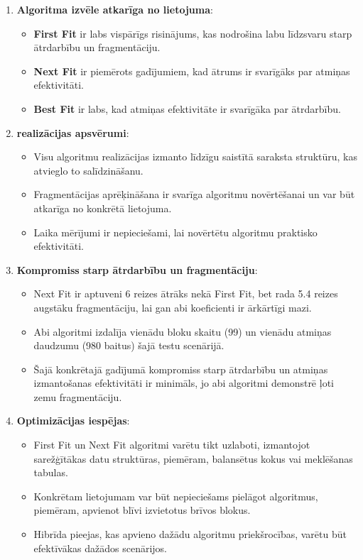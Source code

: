 \documentclass{report}
\begin{document}
	\begin{enumerate}
		\item \textbf{Algoritma izvēle atkarīga no lietojuma}:
		\begin{itemize}
			\item \textbf{First Fit} ir labs vispārīgs risinājums, kas nodrošina labu līdzsvaru starp ātrdarbību un fragmentāciju.
			\item \textbf{Next Fit} ir piemērots gadījumiem, kad ātrums ir svarīgāks par atmiņas efektivitāti.
			\item \textbf{Best Fit} ir labs, kad atmiņas efektivitāte ir svarīgāka par ātrdarbību.
		\end{itemize}
		
		\item \textbf{realizācijas apsvērumi}:
		\begin{itemize}
			\item Visu algoritmu realizācijas izmanto līdzīgu saistītā saraksta struktūru, kas atvieglo to salīdzināšanu.
			\item Fragmentācijas aprēķināšana ir svarīga algoritmu novērtēšanai un var būt atkarīga no konkrētā lietojuma.
			\item Laika mērījumi ir nepieciešami, lai novērtētu algoritmu praktisko efektivitāti.
		\end{itemize}
		
		\item \textbf{Kompromiss starp ātrdarbību un fragmentāciju}:
		\begin{itemize}
			\item Next Fit ir aptuveni 6 reizes ātrāks nekā First Fit, bet rada 5.4 reizes augstāku fragmentāciju, lai gan abi koeficienti ir ārkārtīgi mazi.
			\item Abi algoritmi izdalīja vienādu bloku skaitu (99) un vienādu atmiņas daudzumu (980 baitus) šajā testu scenārijā.
			\item Šajā konkrētajā gadījumā kompromiss starp ātrdarbību un atmiņas izmantošanas efektivitāti ir minimāls, jo abi algoritmi demonstrē ļoti zemu fragmentāciju.
		\end{itemize}
		
		\item \textbf{Optimizācijas iespējas}:
		\begin{itemize}
			\item First Fit un Next Fit algoritmi varētu tikt uzlaboti, izmantojot sarežģītākas datu struktūras, piemēram, balansētus kokus vai meklēšanas tabulas.
			\item Konkrētam lietojumam var būt nepieciešams pielāgot algoritmus, piemēram, apvienot blīvi izvietotus brīvos blokus.
			\item Hibrīda pieejas, kas apvieno dažādu algoritmu priekšrocības, varētu būt efektīvākas dažādos scenārijos.
		\end{itemize}
		
	\end{enumerate}
	
\end{document}
